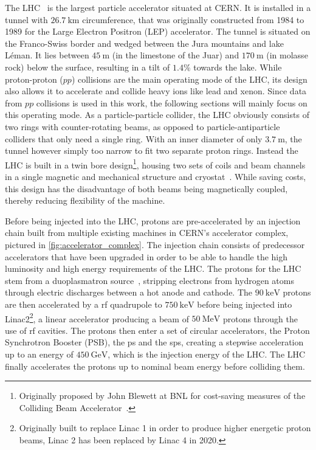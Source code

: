 The LHC~\cite{Evans:1129806} is the largest particle accelerator situated at CERN. It is installed in a tunnel with $\SI{26.7}{\km}$ circumference, that was originally constructed from 1984 to 1989 for the Large Electron Positron (LEP) accelerator. The tunnel is situated on the Franco-Swiss border and wedged between the Jura mountains and lake Léman. It lies between $\SI{45}{\meter}$ (in the limestone of the Juar) and $\SI{170}{\meter}$ (in molasse rock) below the surface, resulting in a tilt of $1.4\%$ towards the lake.  While proton-proton ($pp$) collisions are the main operating mode of the LHC, its design also allows it to accelerate and collide heavy ions like lead and xenon. Since data from $pp$ collisions is used in this work, the following sections will mainly focus on this operating mode. As a particle-particle collider, the LHC obviously consists of two rings with counter-rotating beams, as opposed to particle-antiparticle colliders that only need a single ring. With an inner diameter of only $\SI{3.7}{\meter}$, the tunnel however simply too narrow to fit two separate proton rings. Instead the LHC is built in a twin bore design\footnote{Originally proposed by John Blewett at BNL for cost-saving measures of the Colliding Beam Accelerator~\cite{Evans:1129806}.}, housing two sets of coils and beam channels in a single magnetic and mechanical structure and cryostat~\cite{Evans:1129806}. While saving costs, this design has the disadvantage of both beams being magnetically coupled, thereby reducing flexibility of the machine. 

Before being injected into the LHC, protons are pre-accelerated by an injection chain built from multiple existing machines in CERN's accelerator complex, pictured in \cref{fig:accelerator_complex}. The injection chain consists of predecessor accelerators that have been upgraded in order to be able to handle the high luminosity and high energy requirements of the LHC. The protons for the LHC stem from a duoplasmatron source~\cite{Scrivens:1382102}, stripping electrons from hydrogen atoms through electric discharges between a hot anode and cathode. The $\SI{90}{\keV}$ protons are then accelerated by a \gls{rf} quadrupole to $\SI{750}{\keV}$ before being injected into Linac2\footnote{Originally built to replace Linac 1 in order to produce higher energetic proton beams, Linac 2 has been replaced by Linac 4 in 2020.}, a linear accelerator producing a beam of $\SI{50}{\MeV}$ protons through the use of \gls{rf} cavities. The protons then enter a set of circular accelerators, the Proton Synchrotron Booster (PSB), the \gls{ps} and the \gls{sps}, creating a stepwise acceleration up to an energy of $\SI{450}{\GeV}$, which is the injection energy of the LHC. The LHC finally accelerates the protons up to nominal beam energy before colliding them. 

